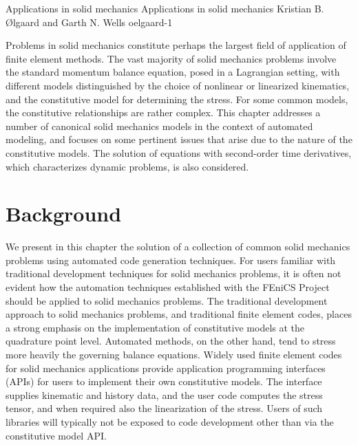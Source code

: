               {Applications in solid mechanics}
              {Applications in solid mechanics}
              {Kristian B. {\O}lgaard and Garth N. Wells}
              {oelgaard-1}

Problems in solid mechanics constitute perhaps the largest field of
application of finite element methods. The vast majority of solid
mechanics problems involve the standard momentum balance equation,
posed in a Lagrangian setting, with different models distinguished by the
choice of nonlinear or linearized kinematics, and the constitutive model
for determining the stress. For some common models, the constitutive
relationships are rather complex. This chapter addresses a number of
canonical solid mechanics models in the context of automated modeling,
and focuses on some pertinent issues that arise due to the nature of the
constitutive models. The solution of equations with second-order time
derivatives, which characterizes dynamic problems, is also considered.

\section{Background}

We present in this chapter the solution of a collection of common
solid mechanics problems using automated code generation techniques.
For users familiar with traditional development techniques for
solid mechanics problems, it is often not evident how the automation
techniques established with the FEniCS Project should be applied to
solid mechanics problems.  The traditional development approach to solid
mechanics problems, and traditional finite element codes, places a strong
emphasis on the implementation of constitutive models at the quadrature
point level. Automated methods, on the other hand, tend to stress more
heavily the governing balance equations.  Widely used finite element
codes for solid mechanics applications provide application programming
interfaces (APIs) for users to implement their own constitutive models.
The interface supplies kinematic and history data, and the user code
computes the stress tensor, and when required also the linearization
of the stress. Users of such libraries will typically not be exposed to
code development other than via the constitutive model API.

